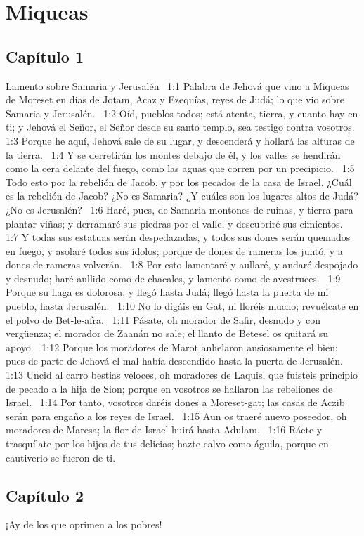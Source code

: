 \chapter{Miqueas}
\section*{Capítulo 1 }
Lamento sobre Samaria y Jerusalén  
1:1 Palabra de Jehová que vino a Miqueas de Moreset en días de Jotam, Acaz y Ezequías, reyes de Judá; lo que vio sobre Samaria y Jerusalén.  
1:2 Oíd, pueblos todos; está atenta, tierra, y cuanto hay en ti; y Jehová el Señor, el Señor desde su santo templo, sea testigo contra vosotros.  
1:3 Porque he aquí, Jehová sale de su lugar, y descenderá y hollará las alturas de la tierra.  
1:4 Y se derretirán los montes debajo de él, y los valles se hendirán como la cera delante del fuego, como las aguas que corren por un precipicio.  
1:5 Todo esto por la rebelión de Jacob, y por los pecados de la casa de Israel. ¿Cuál es la rebelión de Jacob? ¿No es Samaria? ¿Y cuáles son los lugares altos de Judá? ¿No es Jerusalén?  
1:6 Haré, pues, de Samaria montones de ruinas, y tierra para plantar viñas; y derramaré sus piedras por el valle, y descubriré sus cimientos.  
1:7 Y todas sus estatuas serán despedazadas, y todos sus dones serán quemados en fuego, y asolaré todos sus ídolos; porque de dones de rameras los juntó, y a dones de rameras volverán.  
1:8 Por esto lamentaré y aullaré, y andaré despojado y desnudo; haré aullido como de chacales, y lamento como de avestruces.  
1:9 Porque su llaga es dolorosa, y llegó hasta Judá; llegó hasta la puerta de mi pueblo, hasta Jerusalén.  
1:10 No lo digáis en Gat, ni lloréis mucho; revuélcate en el polvo de Bet-le-afra.  
1:11 Pásate, oh morador de Safir, desnudo y con vergüenza; el morador de Zaanán no sale; el llanto de Betesel os quitará su apoyo.  
1:12 Porque los moradores de Marot anhelaron ansiosamente el bien; pues de parte de Jehová el mal había descendido hasta la puerta de Jerusalén.  
1:13 Uncid al carro bestias veloces, oh moradores de Laquis, que fuisteis principio de pecado a la hija de Sion; porque en vosotros se hallaron las rebeliones de Israel.  
1:14 Por tanto, vosotros daréis dones a Moreset-gat; las casas de Aczib serán para engaño a los reyes de Israel.  
1:15 Aun os traeré nuevo poseedor, oh moradores de Maresa; la flor de Israel huirá hasta Adulam.  
1:16 Ráete y trasquílate por los hijos de tus delicias; hazte calvo como águila, porque en cautiverio se fueron de ti.  
\section*{Capítulo 2 }
¡Ay de los que oprimen a los pobres!  

